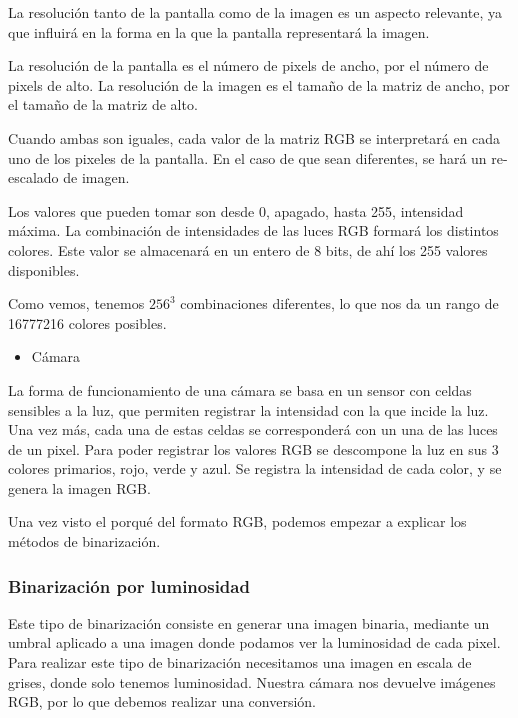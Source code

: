 La resolución tanto de la pantalla como de la imagen es un aspecto relevante, ya que influirá en la forma en la que la pantalla representará la imagen.
 
La resolución de la pantalla\cite{res_pantalla} es el número de pixels de ancho, por el número de pixels de alto. La resolución de la imagen\cite{res_imagen} es el tamaño de la matriz de ancho, por el tamaño de la matriz de alto.

Cuando ambas son iguales, cada valor de la matriz RGB se interpretará en cada uno de los pixeles de la pantalla. En el caso de que sean diferentes, se hará un re-escalado\cite{resize} de imagen.

Los valores que pueden tomar son desde 0, apagado, hasta 255, intensidad máxima. La combinación de intensidades de las luces RGB formará los distintos colores. Este valor se almacenará en un entero de 8 bits, de ahí los 255 valores disponibles.


Como vemos, tenemos $256^3$ combinaciones diferentes, lo que nos da un rango de 16777216 colores posibles.

\begin{itemize}

	\item Cámara
	
\end{itemize}

La forma de funcionamiento de una cámara se basa en un sensor con celdas sensibles a la luz, que permiten registrar la intensidad con la que incide la luz.
Una vez más, cada una de estas celdas se corresponderá con un una de las luces de un pixel. Para poder registrar los valores RGB se descompone la luz en sus 3 colores primarios, rojo, verde y azul. Se registra la intensidad de cada color, y se genera la imagen RGB.

Una vez visto el porqué del formato RGB, podemos empezar a explicar los métodos de binarización.

\subsubsection{Binarización por luminosidad}
Este tipo de binarización\cite{binar} consiste en generar una imagen binaria, mediante un umbral aplicado a una imagen donde podamos ver la luminosidad de cada pixel.
Para realizar este tipo de binarización necesitamos una imagen en escala de grises, donde solo tenemos luminosidad. Nuestra cámara nos devuelve imágenes RGB, por lo que debemos realizar una conversión. 

